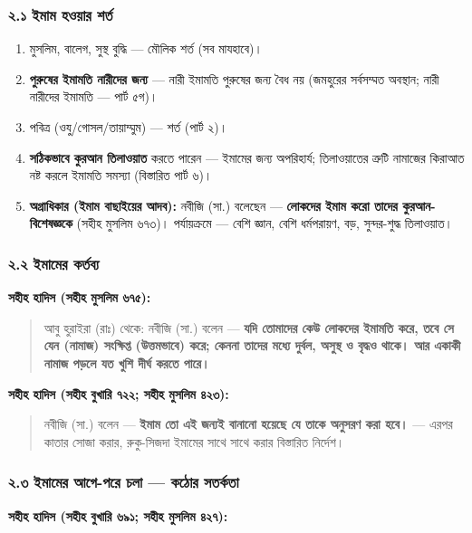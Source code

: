 \subsubsection*{২.১ ইমাম হওয়ার শর্ত}

\begin{enumerate}
\item মুসলিম, বালেগ, সুস্থ বুদ্ধি — মৌলিক শর্ত (সব মাযহাবে)।
\item \textbf{পুরুষের ইমামতি নারীদের জন্য} — নারী ইমামতি পুরুষের জন্য বৈধ নয় (জমহুরের সর্বসম্মত অবস্থান; নারী নারীদের ইমামতি — পার্ট ৫গ)।
\item পবিত্র (ওযু/গোসল/তায়াম্মুম) — শর্ত (পার্ট ২)।
\item \textbf{সঠিকভাবে কুরআন তিলাওয়াত} করতে পারেন — ইমামের জন্য অপরিহার্য; তিলাওয়াতের ত্রুটি নামাজের কিরাআত নষ্ট করলে ইমামতি সমস্যা (বিস্তারিত পার্ট ৬)।
\item \textbf{অগ্রাধিকার (ইমাম বাছাইয়ের আদব):} নবীজি (সা.) বলেছেন — \textbf{লোকদের ইমাম করো তাদের কুরআন-বিশেষজ্ঞকে} (সহীহ মুসলিম ৬৭৩)। পর্যায়ক্রমে — বেশি জ্ঞান, বেশি ধর্মপরায়ণ, বড়, সুন্দর-শুদ্ধ তিলাওয়াত।
\end{enumerate}
\subsubsection*{২.২ ইমামের কর্তব্য}

\textbf{সহীহ হাদিস (সহীহ মুসলিম ৬৭৫):}

\begin{quote}
আবু হুরাইরা (রাঃ) থেকে: নবীজি (সা.) বলেন — \textbf{যদি তোমাদের কেউ লোকদের ইমামতি করে, তবে সে যেন (নামাজ) সংক্ষিপ্ত (উত্তমভাবে) করে; কেননা তাদের মধ্যে দুর্বল, অসুস্থ ও বৃদ্ধও থাকে। আর একাকী নামাজ পড়লে যত খুশি দীর্ঘ করতে পারে।}
\end{quote}

\textbf{সহীহ হাদিস (সহীহ বুখারি ৭২২; সহীহ মুসলিম ৪২৩):}

\begin{quote}
নবীজি (সা.) বলেন — \textbf{ইমাম তো এই জন্যই বানানো হয়েছে যে তাকে অনুসরণ করা হবে।} — এরপর কাতার সোজা করার, রুকু-সিজদা ইমামের সাথে সাথে করার বিস্তারিত নির্দেশ।
\end{quote}

\subsubsection*{২.৩ ইমামের আগে-পরে চলা — কঠোর সতর্কতা}

\textbf{সহীহ হাদিস (সহীহ বুখারি ৬৯১; সহীহ মুসলিম ৪২৭):}

